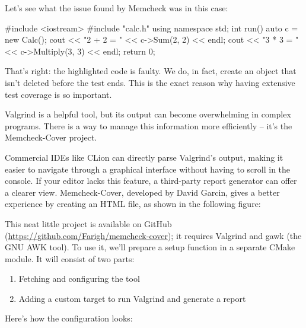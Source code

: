 Let’s see what the issue found by Memcheck was in this case:


\begin{cpp}
#include <iostream>
#include "calc.h"
using namespace std;
int run() {
    auto c = new Calc();
    cout << "2 + 2 = " << c->Sum(2, 2) << endl;
    cout << "3 * 3 = " << c->Multiply(3, 3) << endl;
    return 0;
}
\end{cpp}

That’s right: the highlighted code is faulty. We do, in fact, create an object that isn’t deleted before the test ends. This is the exact reason why having extensive test coverage is so important.

Valgrind is a helpful tool, but its output can become overwhelming in complex programs. There is a way to manage this information more efficiently – it’s the Memcheck-Cover project.


Commercial IDEs like CLion can directly parse Valgrind's output, making it easier to navigate through a graphical interface without having to scroll in the console. If your editor lacks this feature, a third-party report generator can offer a clearer view. Memcheck-Cover, developed by David Garcin, gives a better experience by creating an HTML file, as shown in the following figure:


This neat little project is available on GitHub (\url{https://github.com/Farigh/memcheck-cover}); it requires Valgrind and gawk (the GNU AWK tool). To use it, we’ll prepare a setup function in a separate CMake module. It will consist of two parts:

\begin{enumerate}
\item
Fetching and configuring the tool

\item
Adding a custom target to run Valgrind and generate a report
\end{enumerate}

Here’s how the configuration looks:



